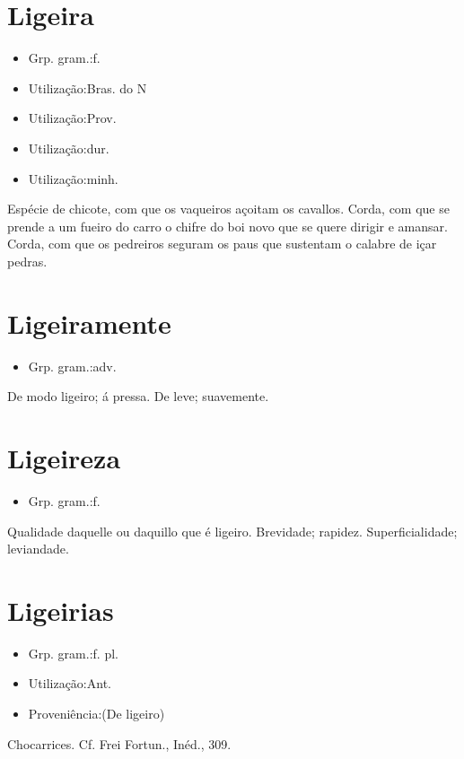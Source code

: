 \section{Ligeira}
\begin{itemize}
\item {Grp. gram.:f.}
\end{itemize}
\begin{itemize}
\item {Utilização:Bras. do N}
\end{itemize}
\begin{itemize}
\item {Utilização:Prov.}
\end{itemize}
\begin{itemize}
\item {Utilização:dur.}
\end{itemize}
\begin{itemize}
\item {Utilização:minh.}
\end{itemize}
Espécie de chicote, com que os vaqueiros açoitam os cavallos.
Corda, com que se prende a um fueiro do carro o chifre do boi novo que se quere dirigir e amansar.
Corda, com que os pedreiros seguram os paus que sustentam o calabre de içar pedras.
\section{Ligeiramente}
\begin{itemize}
\item {Grp. gram.:adv.}
\end{itemize}
De modo ligeiro; á pressa.
De leve; suavemente.
\section{Ligeireza}
\begin{itemize}
\item {Grp. gram.:f.}
\end{itemize}
Qualidade daquelle ou daquillo que é ligeiro.
Brevidade; rapidez.
Superficialidade; leviandade.
\section{Ligeirias}
\begin{itemize}
\item {Grp. gram.:f. pl.}
\end{itemize}
\begin{itemize}
\item {Utilização:Ant.}
\end{itemize}
\begin{itemize}
\item {Proveniência:(De \textunderscore ligeiro\textunderscore )}
\end{itemize}
Chocarrices. Cf. Frei Fortun., \textunderscore Inéd.\textunderscore , 309.
